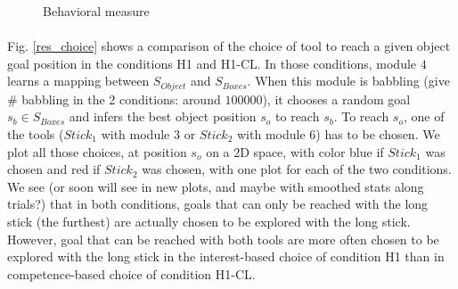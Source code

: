 \documentclass[10pt,letterpaper]{article}
\begin{document}
	\begin{figure}[ht]
		\centering
		\caption{Behavioral measure}
		\label{res_ow}
	\end{figure}



	\paragraph{}
	Fig. \ref{res_choice} shows a comparison of the choice of tool to reach a given object goal position in the conditions H1 and H1-CL.
	In those conditions, module $4$ learns a mapping between $S_{Object}$ and $S_{Boxes}$. 
	When this module is babbling (give \# babbling in the 2 conditions: around $100000$), it chooses a random goal $s_b \in S_{Boxes}$ and infers the best object position $s_o$ to reach $s_b$.
	To reach $s_o$, one of the tools ($Stick_1$ with module $3$ or $Stick_2$ with module $6$) has to be chosen. 
	We plot all those choices, at position $s_o$ on a $2$D space, with color blue if $Stick_1$ was chosen and red if $Stick_2$ was chosen, with one plot for each of the two conditions.
	We see (or soon will see in new plots, and maybe with smoothed stats along trials?) that in both conditions, 
	goals that can only be reached with the long stick (the furthest) are actually chosen to be explored with the long stick.
	However, goal that can be reached with both tools are more often chosen to be explored with the long stick in the interest-based choice of condition H1 than in competence-based choice of condition H1-CL.
	
\end{document}
